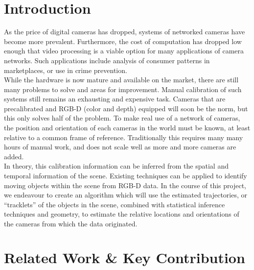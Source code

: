 \documentclass[journal]{IEEEtran}
\begin{document}
\section{Introduction}
	\indent As the price of digital cameras has dropped, systems of networked cameras have become more prevalent. Furthermore, the cost of computation has dropped low enough that video processing is a viable option for many applications of camera networks. Such applications include analysis of consumer patterns in marketplaces, or use in crime prevention. \\
	\indent While the hardware is now mature and available on the market, there are still many problems to solve and areas for improvement. Manual calibration of such systems still remains an exhausting and expensive task. Cameras that are precalibrated and RGB-D (color and depth) equipped will soon be the norm, but this only solves half of the problem. To make real use of a network of cameras, the position and orientation of each cameras in the world must be known, at least relative to a common frame of reference. Traditionally this requires many many hours of manual work, and does not scale well as more and more cameras are added. \\
	\indent In theory, this calibration information can be inferred from the spatial and temporal information of the scene. Existing techniques can be applied to identify moving objects within the scene from RGB-D data. In the course of this project, we endeavour to create an algorithm which will use the estimated trajectories, or “tracklets” of the objects in the scene, combined with statistical inference techniques and geometry, to estimate the relative locations and orientations of the cameras from which the data originated.

\section{Related Work \& Key Contribution}
\end{document}

